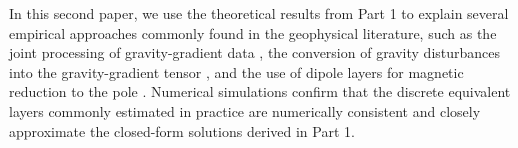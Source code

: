 In this second paper, we use the theoretical results from Part 1 to explain several empirical 
approaches commonly found in the geophysical literature, such as the joint processing of gravity-gradient data 
\cite[e.g.,][]{barnes_lumley2011}, the conversion of gravity disturbances into the gravity-gradient tensor 
\cite[e.g.,][]{piauilino_etal2019_seg, oliveirajr_etal2023, piauilino_etal2025b}, and the use of dipole layers for magnetic reduction to the pole 
\cite[e.g.,][]{emilia1973, bhattacharyya_chan1977, silva1986, leao-silva_1989, oliveirajr_etal2013, li_etal2014, oliveirajr_etal2015, 
ribeiro_filho_etal2020, reis_etal2020, li-etal2021, takahashi-etal2022, piauilino_etal2025}. 
Numerical simulations confirm that the discrete equivalent layers commonly estimated in practice 
are numerically consistent and closely approximate the closed-form solutions derived in Part 1.